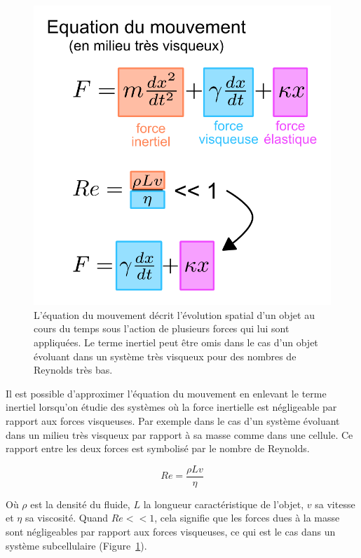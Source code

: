 \documentclass[12pt,a4paper,twoside,openright]{book}
\begin{document}
\begin{figure}[htbp]
\centering
\includegraphics{figures/intro/motion_equation.png}
\caption[L'équation du mouvement]{\label{fig:motion_equation}L'équation
du mouvement décrit l'évolution spatial d'un objet au cours du temps
sous l'action de plusieurs forces qui lui sont appliquées. Le terme
inertiel peut être omis dans le cas d'un objet évoluant dans un système
très visqueux pour des nombres de Reynolds très bas.}
\end{figure}

Il est possible d'approximer l'équation du mouvement en enlevant le
terme inertiel lorsqu'on étudie des systèmes où la force inertielle est
négligeable par rapport aux forces visqueuses. Par exemple dans le cas
d'un système évoluant dans un milieu très visqueux par rapport à sa
masse comme dans une cellule. Ce rapport entre les deux forces est
symbolisé par le nombre de Reynolds.

\[
Re = \frac{\rho Lv}{\eta}
\]

Où \(\rho\) est la densité du fluide, \(L\) la longueur caractéristique
de l'objet, \(v\) sa vitesse et \(\eta\) sa viscosité. Quand
\(Re << 1\), cela signifie que les forces dues à la masse sont
négligeables par rapport aux forces visqueuses, ce qui est le cas dans
un système subcellulaire (Figure~\ref{fig:motion_equation}).
\end{document}
